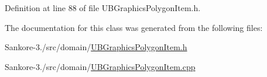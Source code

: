 Definition at line 88 of file U\-B\-Graphics\-Polygon\-Item.\-h.



The documentation for this class was generated from the following files\-:\begin{DoxyCompactItemize}
\item 
Sankore-\/3./src/domain/\hyperlink{_u_b_graphics_polygon_item_8h}{U\-B\-Graphics\-Polygon\-Item.\-h}\item 
Sankore-\/3./src/domain/\hyperlink{_u_b_graphics_polygon_item_8cpp}{U\-B\-Graphics\-Polygon\-Item.\-cpp}\end{DoxyCompactItemize}
